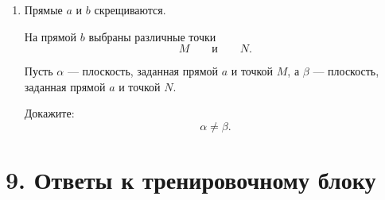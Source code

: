 \documentclass[a4paper,12pt]{article}
\begin{document}
\begin{enumerate}[resume]

    \item
    Прямые $a$ и $b$ скрещиваются.

    На прямой $b$ выбраны различные точки
    \[
    M
    \qquad\text{и}\qquad
    N.
    \]

    Пусть $\alpha$ --- плоскость,
    заданная прямой $a$ и точкой $M$,
    а $\beta$ --- плоскость,
    заданная прямой $a$ и точкой $N$.

    Докажите:
    \[
    \alpha\ne\beta.
    \]

\end{enumerate}


\clearpage

\section*{9. Ответы к тренировочному блоку}
\end{document}
